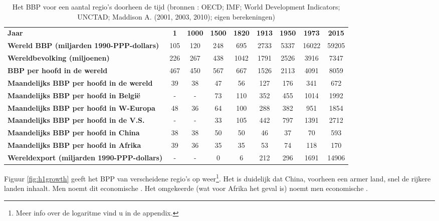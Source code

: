 \begin{table}[H]
\small\centering\captionsetup{justification=centering,margin=2cm}
\begin{tabular}{l | c | c | c | c | c | c | c | c}
\textbf{Jaar} & \textbf{1} & \textbf{1000} & \textbf{1500} & \textbf{1820} & \textbf{1913} & \textbf{1950} & \textbf{1973} & \textbf{2015} \\
\textbf{Wereld BBP (miljarden 1990-PPP-dollars)} & 105 & 120 & 248 & 695 & 2733 & 5337 & 16022 & 59205 \\
\textbf{Wereldbevolking (miljoenen)} & 226 & 267 & 438 & 1042 & 1791 & 2526 & 3916 & 7347 \\
\textbf{BBP per hoofd in de wereld} & 467 & 450 & 567 & 667 & 1526 & 2113 & 4091 & 8059 \\
\textbf{Maandelijks BBP per hoofd in de wereld} & 39 & 38 & 47 & 56 & 127 & 176 & 341 & 672 \\
\textbf{Maandelijks BBP per hoofd in Belgi\"e} & - & - & 73 & 110 & 352 & 455 & 1014 & 1992 \\
\textbf{Maandelijks BBP per hoofd in W-Europa} & 48 & 36 & 64 & 100 & 288 & 382 & 951 & 1854 \\
\textbf{Maandelijks BBP per hoofd in de V.S.} & - & - & 33 & 105 & 442 & 797 & 1391 & 2712 \\
\textbf{Maandelijks BBP per hoofd in China} & 38 & 38 & 50 & 50 & 46 & 37 & 70 & 593 \\
\textbf{Maandelijks BBP per hoofd in Afrika} & 39 & 36 & 35 & 35 & 53 & 74 & 118 & 170 \\
\textbf{Wereldexport (miljarden 1990-PPP-dollars)} & - & - & 0 & 6 & 212 & 296 & 1691 & 14906 \\
\end{tabular}
\caption{Het BBP voor een aantal regio's doorheen de tijd (bronnen : OECD; IMF; World Development Indicators; UNCTAD; Maddison A. (2001, 2003, 2010); eigen berekeningen)}
\label{tab:h1bbp}
\end{table}

\par Figuur \ref{fig:h1growth} geeft het BPP van verscheidene regio's op  weer\footnote{Meer info over de logaritme vind u in de appendix.}. Het is duidelijk dat China, voorheen een armer land, snel de rijkere landen inhaalt. Men noemt dit economische . Het omgekeerde (wat voor Afrika het geval is) noemt men economische . \\

